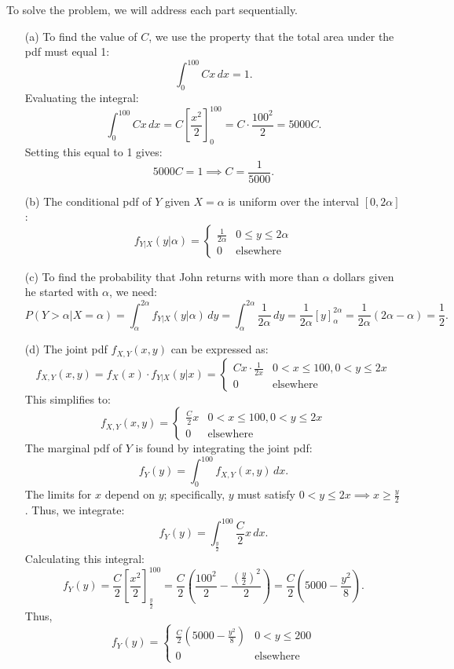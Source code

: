 \begin{solution}
To solve the problem, we will address each part sequentially.

\begin{enumerate}
    \item[(a)] To find the value of $C$, we use the property that the total area under the pdf must equal 1:
    \[
    \int_0^{100} Cx \, dx = 1.
    \]
    Evaluating the integral:
    \[
    \int_0^{100} Cx \, dx = C \left[ \frac{x^2}{2} \right]_0^{100} = C \cdot \frac{100^2}{2} = 5000C.
    \]
    Setting this equal to 1 gives:
    \[
    5000C = 1 \implies C = \frac{1}{5000}.
    \]

    \item[(b)] The conditional pdf of $Y$ given $X = \alpha$ is uniform over the interval $[0, 2\alpha]$:
    \[
    f_{Y|X}(y|\alpha) = 
    \begin{cases} 
    \frac{1}{2\alpha} & 0 \leq y \leq 2\alpha \\ 
    0 & \text{elsewhere} 
    \end{cases}
    \]

    \item[(c)] To find the probability that John returns with more than $\alpha$ dollars given he started with $\alpha$, we need:
    \[
    P(Y > \alpha | X = \alpha) = \int_{\alpha}^{2\alpha} f_{Y|X}(y|\alpha) \, dy = \int_{\alpha}^{2\alpha} \frac{1}{2\alpha} \, dy = \frac{1}{2\alpha} \left[ y \right]_{\alpha}^{2\alpha} = \frac{1}{2\alpha} (2\alpha - \alpha) = \frac{1}{2}.
    \]

    \item[(d)] The joint pdf $f_{X,Y}(x,y)$ can be expressed as:
    \[
    f_{X,Y}(x,y) = f_X(x) \cdot f_{Y|X}(y|x) = 
    \begin{cases} 
    Cx \cdot \frac{1}{2x} & 0 < x \leq 100, 0 < y \leq 2x \\ 
    0 & \text{elsewhere} 
    \end{cases}
    \]
    This simplifies to:
    \[
    f_{X,Y}(x,y) = 
    \begin{cases} 
    \frac{C}{2} x & 0 < x \leq 100, 0 < y \leq 2x \\ 
    0 & \text{elsewhere} 
    \end{cases}
    \]
    The marginal pdf of $Y$ is found by integrating the joint pdf:
    \[
    f_Y(y) = \int_0^{100} f_{X,Y}(x,y) \, dx.
    \]
    The limits for $x$ depend on $y$; specifically, $y$ must satisfy $0 < y \leq 2x \implies x \geq \frac{y}{2}$. Thus, we integrate:
    \[
    f_Y(y) = \int_{\frac{y}{2}}^{100} \frac{C}{2} x \, dx.
    \]
    Calculating this integral:
    \[
    f_Y(y) = \frac{C}{2} \left[ \frac{x^2}{2} \right]_{\frac{y}{2}}^{100} = \frac{C}{2} \left( \frac{100^2}{2} - \frac{\left(\frac{y}{2}\right)^2}{2} \right) = \frac{C}{2} \left( 5000 - \frac{y^2}{8} \right).
    \]
    Thus,
    \[
    f_Y(y) = 
    \begin{cases} 
    \frac{C}{2} \left( 5000 - \frac{y^2}{8} \right) & 0 < y \leq 200 \\ 
    0 & \text{elsewhere} 
    \end{cases}
    \]
\end{enumerate}
\end{solution}

